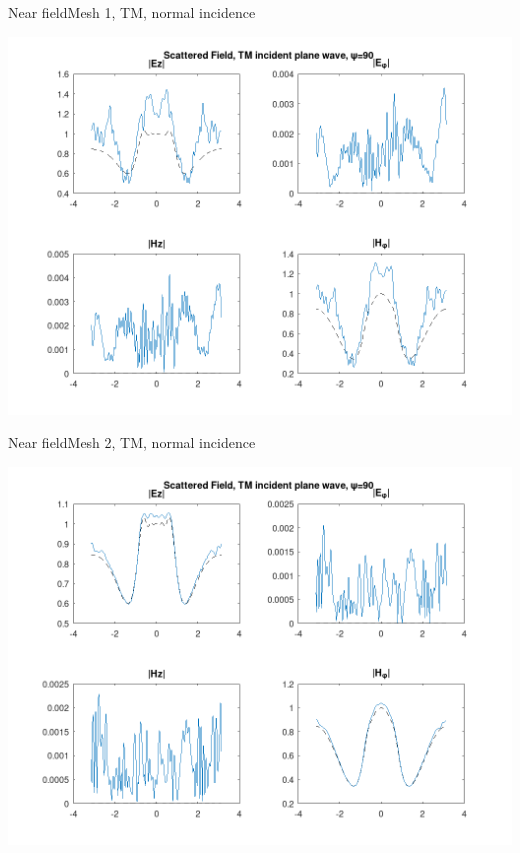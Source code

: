 
\begin{frame}{Near field}{Mesh 1, TM, normal incidence}

\includegraphics[width=0.95\linewidth]{results/pec_y_malla_gorda_90_TM/NF.png}
  
\end{frame}
  

\begin{frame}{Near field}{Mesh 2, TM, normal incidence}

\includegraphics[width=0.95\linewidth]{results/pec_y_malla_fina_90_TM/NF.png}
  
\end{frame}

